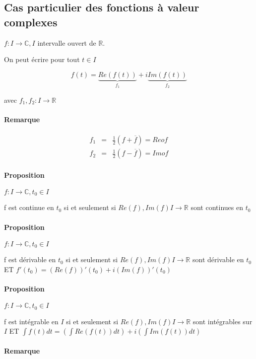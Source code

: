 \subsection{Cas particulier des fonctions à valeur complexes}

$f : I \rightarrow \mathbb{C}, I$ intervalle ouvert de $\mathbb{R}$.

On peut écrire pour tout $t \in I$

\[f(t) = \underbrace{Re(f(t))}_{f_1} + i\underbrace{Im(f(t))}_{f_2}\]

avec $f_1, f_2 : I \rightarrow \mathbb{R}$

\paragraph{Remarque}

\[\begin{array}{rcl}
	f_1 &=& \frac{1}{2}(f + \overline{f}) = Re o f \\
	f_2 &=& \frac{1}{2}(f - \overline{f}) = Im o f
\end{array}\]

\paragraph{Proposition} $f : I \rightarrow \mathbb{C}, t_0 \in I$

f est continue en $t_0$ si et seulement si $Re(f), Im(f) I \rightarrow \mathbb{R}$ sont continues en $t_0$

\paragraph{Proposition} $f : I \rightarrow \mathbb{C}, t_0 \in I$

f est dérivable en $t_0$ si et seulement si $Re(f), Im(f) I \rightarrow \mathbb{R}$ sont dérivable en $t_0$
ET $f'(t_0) = (Re(f))'(t_0) + i (Im(f))'(t_0)$

\paragraph{Proposition} $f : I \rightarrow \mathbb{C}, t_0 \in I$

f est intégrable en $I$ si et seulement si $Re(f), Im(f) I \rightarrow \mathbb{R}$ sont intégrables sur $I$
ET $\int f(t)dt = (\int Re(f(t))dt) + i (\int Im(f(t))dt)$

\paragraph{Remarque}

